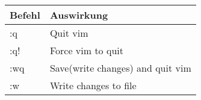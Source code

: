            \begin{longtable}{|p{7cm}|p{8cm}|}
               
               \hline

               \rowcolor{tableheadcolor}
               
               \textbf{Befehl} & \textbf{Auswirkung}

               \\ \hline

               :q & Quit vim

               \\ \hline

               :q! & Force vim to quit

               \\ \hline

               :wq & Save(write changes) and quit vim

               \\ \hline

               :w & Write changes to file

               \\ \hline

            \end{longtable}

        
